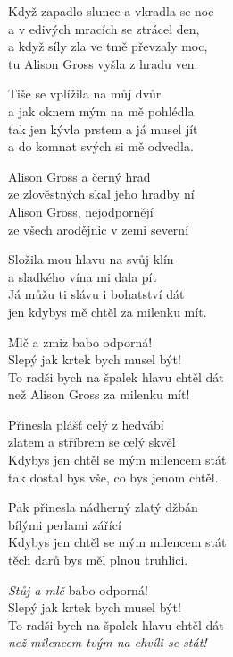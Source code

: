 
\ve{}
Když zapadlo slunce a vkradla se noc\\
a v edivých mracích se ztrácel den,\\
a když síly zla ve tmě převzaly moc,\\
tu Alison Gross vyšla z hradu ven.

\ve{}
Tiše se vplížila na můj dvůr\\
a jak oknem mým na mě pohlédla\\
tak jen kývla prstem a já musel jít\\
a do komnat svých si mě odvedla.

\cho{}
Alison Gross a černý hrad\\
ze zlověstných skal jeho hradby ní\\
Alison Gross, nejodpornějí\\
ze všech arodějnic v zemi severní

\ve{}
Složila mou hlavu na svůj klín\\
a sladkého vína mi dala pít\\
Já můžu ti slávu i bohatství dát\\
jen kdybys mě chtěl za milenku mít.

Mlč a zmiz babo odporná!\\
Slepý jak krtek bych musel být!\\
To radši bych na špalek hlavu chtěl dát\\
než Alison Gross za milenku mít!

\cho{}

\ve{}
Přinesla plášť celý z hedvábí\\
zlatem a stříbrem se celý skvěl\\
Kdybys jen chtěl se mým milencem stát\\
tak dostal bys vše, co bys jenom chtěl.

\ve{}
Pak přinesla nádherný zlatý džbán\\
bílými perlami zářící\\
Kdybys jen chtěl se mým milencem stát\\
těch darů bys měl plnou truhlici.

\textit{Stůj a mlč} babo odporná!\\
Slepý jak krtek bych musel být!\\
To radši bych na špalek hlavu chtěl dát\\
\textit{než milencem tvým na chvíli se stát!}

